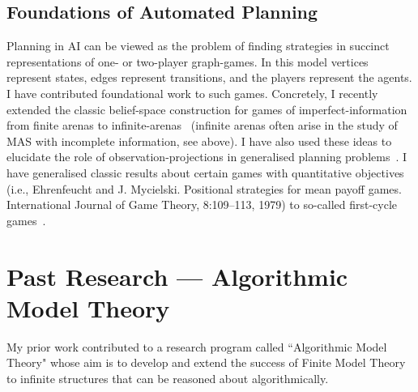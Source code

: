 \documentclass[10pt,a4paper,sans]{moderncv}
\begin{document}
 
\subsection{Foundations of Automated Planning}
Planning in AI can be viewed as the problem of finding strategies in succinct representations of one- or two-player graph-games. In this model vertices represent states, edges represent transitions, and the players represent the agents. I have contributed foundational work to such games. Concretely, I recently extended the classic belief-space construction for games of imperfect-information from finite arenas to infinite-arenas~\cite{GMRS16IJCAI} (infinite arenas often arise in the study of MAS with incomplete information, see above). I have also used these ideas to elucidate the role of observation-projections in generalised planning problems~\cite{BDGR17ICAPS,BDGR17}.
I have generalised classic results about certain games with quantitative objectives (i.e., Ehrenfeucht and J. Mycielski. Positional strategies for mean payoff games. International Journal of Game Theory, 8:109--113, 1979) to so-called first-cycle games~\cite{AR16}.
\newline





\section{Past Research --- Algorithmic Model Theory}
My prior work contributed to a research program called ``Algorithmic  Model Theory" whose aim is to develop and extend the success of Finite Model Theory to infinite structures that can be reasoned about algorithmically. 
\newline
\end{document}
